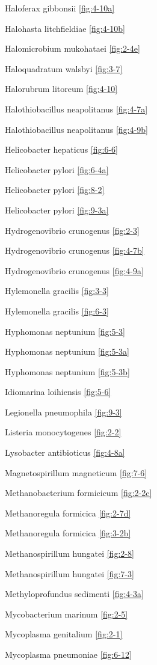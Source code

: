\documentclass[]{tufte-book}
\begin{document}
Haloferax gibbonsii \ref{fig:4-10a}

Halohasta litchfieldiae \ref{fig:4-10b}

Halomicrobium mukohataei \ref{fig:2-4e}

Haloquadratum walsbyi \ref{fig:3-7}

Halorubrum litoreum \ref{fig:4-10}

Halothiobacillus neapolitanus \ref{fig:4-7a}

Halothiobacillus neapolitanus \ref{fig:4-9b}

Helicobacter hepaticus \ref{fig:6-6}

Helicobacter pylori \ref{fig:6-4a}

Helicobacter pylori \ref{fig:8-2}

Helicobacter pylori \ref{fig:9-3a}

Hydrogenovibrio crunogenus \ref{fig:2-3}

Hydrogenovibrio crunogenus \ref{fig:4-7b}

Hydrogenovibrio crunogenus \ref{fig:4-9a}

Hylemonella gracilis \ref{fig:3-3}

Hylemonella gracilis \ref{fig:6-3}

Hyphomonas neptunium \ref{fig:5-3}

Hyphomonas neptunium \ref{fig:5-3a}

Hyphomonas neptunium \ref{fig:5-3b}

Idiomarina loihiensis \ref{fig:5-6}

Legionella pneumophila \ref{fig:9-3}

Listeria monocytogenes \ref{fig:2-2}

Lysobacter antibioticus \ref{fig:4-8a}

Magnetospirillum magneticum \ref{fig:7-6}

Methanobacterium formicicum \ref{fig:2-2c}

Methanoregula formicica \ref{fig:2-7d}

Methanoregula formicica \ref{fig:3-2b}

Methanospirillum hungatei \ref{fig:2-8}

Methanospirillum hungatei \ref{fig:7-3}

Methyloprofundus sedimenti \ref{fig:4-3a}

Mycobacterium marinum \ref{fig:2-5}

Mycoplasma genitalium \ref{fig:2-1}

Mycoplasma pneumoniae \ref{fig:6-12}
\end{document}
